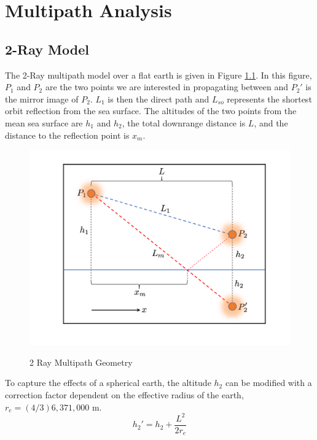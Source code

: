 \chapter{Multipath Analysis}

\section{2-Ray Model}
The 2-Ray multipath model over a flat earth is given in Figure \ref{mp_fig:1}. In this figure, $P_1$ and $P_2$ are the two points we are interested in propagating between and $P_2'$ is the mirror image of $P_2$. $L_1$ is then the direct path and $L_{so}$ represents the shortest orbit reflection from the sea surface. The altitudes of the two points from the mean sea surface are $h_1$ and $h_2$, the total downrange distance is $L$, and the distance to the reflection point is $x_m$.

\begin{figure}[H]
  \begin{center}
\includegraphics[width=5in]{../media/analysis/multipath_2_ray.png}
  \end{center}
  \renewcommand{\baselinestretch}{1} \small\normalsize
  \begin{quote}
    \caption[2 Ray Multipath Geometry]{ 2 Ray Multipath Geometry\label{mp_fig:1}}
  \end{quote}
\end{figure}
\renewcommand{\baselinestretch}{2} \small\normalsize

To capture the effects of a spherical earth, the altitude $h_2$ can be modified with a correction factor \cite{blake_radar} dependent on the effective radius of the earth, $r_e = (4/3) 6,371,000$ m.
\begin{equation}
h_2' = h_2 + \frac{L^2}{2r_e}
\label{mp_eq:0}
\end{equation}

